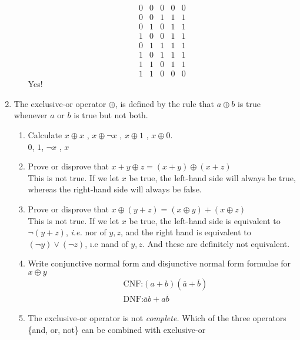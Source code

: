 \documentclass[12pt]{amsart}
\newcommand{\ov}[1]{\overline{#1}}
\begin{document}
\begin{enumerate}
\begin{enumerate}
\[\begin{array}{c|c|c|c|c}
        0   &   0   &   0   &   0   &  0 \\
        0   &   0   &   1   &   1   &  1 \\
        0   &   1   &   0   &   1   &  1 \\
        1   &   0   &   0   &   1   &  1 \\
        0   &   1   &   1   &   1   &  1 \\
        1   &   0   &   1   &   1   &  1 \\
        1   &   1   &   0   &   1   &  1 \\
        1   &   1   &   0   &   0   &  0
    \end{array}
    \]
    Yes!
    \end{enumerate}
\item
    The exclusive-or operator $\oplus$, is defined by the rule that $a \oplus
    b$
    is true whenever $a$ or $b$ is true but not both.
    \begin{enumerate}
    \item Calculate $x \oplus x$ , $x \oplus \neg x$ ,
    $x \oplus 1$ , $x \oplus 0$.\\
    $0$, $1$, $\neg x$ , $x$
    \item Prove or disprove that $x + y \oplus z = (x+ y) \oplus (x+ z)$\\
    This is not true. If we let $x$ be true, the left-hand side will always
    be true, whereas the right-hand side will always be false.
    \item Prove or disprove that $x  \oplus (y +  z) = ( x  \oplus y) + ( x  \oplus z)$\\
    This is not true. If we let $x$ be true, the left-hand side is equivalent
    to $\neg (y + z)$, {\em i.e.} nor of $y,z$,  and the right hand is equivalent
    to $(\neg y ) \vee (\neg z)$, {\i.e} nand of $y,z$. And these are definitely
    not equivalent.
    \item
    Write conjunctive normal form and disjunctive normal form formulae
    for  $x  \oplus  y$\\
    \begin{align*}
    & \text{CNF:} (a + b)( \ov{a} + \ov{b} ) \\
    & \text{DNF:} \ov{a} b+ a \ov{b}
    \end{align*}
    \item The exclusive-or operator is not  {\em complete.} Which of the
    three operators \{and, or, not\} can be combined with exclusive-or

\end{enumerate}
\end{enumerate}
\end{document}
